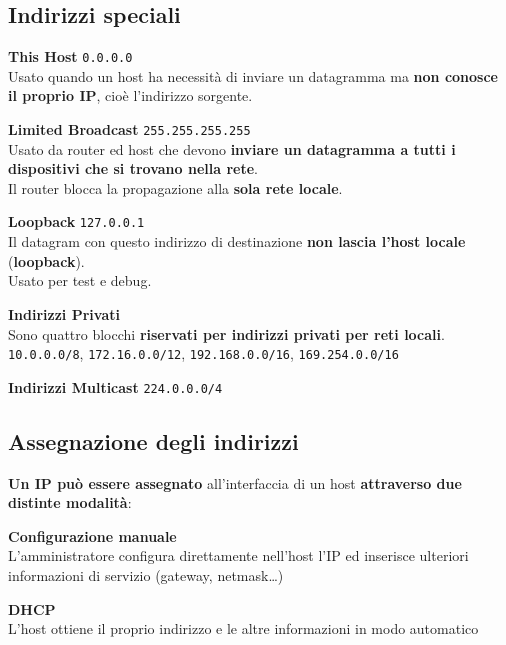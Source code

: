 \documentclass[10pt]{article}
\begin{document}
\subsection{Indirizzi speciali}
\begin{list}{}{}
\item \textbf{This Host} \texttt{0.0.0.0}\\Usato quando un host ha necessità di inviare un datagramma ma \textbf{non conosce il proprio IP}, cioè l'indirizzo sorgente.
\item \textbf{Limited Broadcast} \texttt{255.255.255.255}\\Usato da router ed host che devono \textbf{inviare un datagramma a tutti i dispositivi che si trovano nella rete}.\\
Il router blocca la propagazione alla \textbf{sola rete locale}.
\item \textbf{Loopback} \texttt{127.0.0.1}\\Il datagram con questo indirizzo di destinazione \textbf{non lascia l'host locale} (\textbf{loopback}).\\
Usato per test e debug.
\item \textbf{Indirizzi Privati}\\Sono quattro blocchi \textbf{riservati per indirizzi privati per reti locali}.\\
\texttt{10.0.0.0/8}, \texttt{172.16.0.0/12}, \texttt{192.168.0.0/16}, \texttt{169.254.0.0/16}
\item \textbf{Indirizzi Multicast} \texttt{224.0.0.0/4}
\end{list}
\subsection{Assegnazione degli indirizzi}
\textbf{Un IP può essere assegnato} all'interfaccia di un host \textbf{attraverso due distinte modalità}:
\begin{list}{}{}
\item \textbf{Configurazione manuale}\\
L'amministratore configura direttamente nell'host l'IP ed inserisce ulteriori informazioni di servizio (gateway, netmask\ldots)
\item \textbf{DHCP}\\
L'host ottiene il proprio indirizzo e le altre informazioni in modo automatico
\end{list}
\pagebreak
\end{document}
